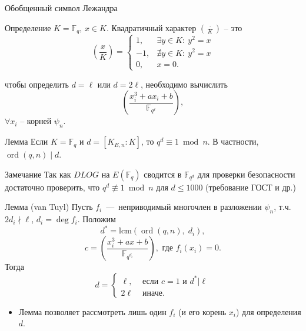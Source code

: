\documentclass{beamer}
\begin{document}
\begin{frame}{Обобщенный символ Лежандра}
\begin{block}{Определение}
    $K = \mathbb{F}_q$, $x \in K$. Квадратичный характер $\left( \frac{ \cdot }{K} \right)$ -- это 
    $$
    \left( \frac{x}{K} \right ) =
    \begin{cases}
        1,& \exists y \in K:\:{y^2} = x \\
        -1,& \nexists y \in K:\:{y^2} = x \\
        0, & x = 0.
    \end{cases}
    $$
\end{block}
\begin{center}
\structure{$\Downarrow$}
\end{center}
чтобы определить $d = \ell$ или $d = 2\ell$, необходимо вычислить 
\[
\left(  {\frac{x_i^3 + a{x_i} + b}{\mathbb{F}_{q^\ell}}} \right ),
\]
$\forall x_i$ -- корней $\psi_n$. 
\end{frame}

\begin{frame}
	\begin{block}{Лемма}
		Если $K = \mathbb{F}_q$ и $d = [K_{E,n} : K]$, то $q^d \equiv 1 \bmod{n}$. В частности, $\operatorname{ord}(q,n) \mid d$.
	\end{block}

\vspace*{1em}
\begin{block}{Замечание}
Так как $DLOG$ на $E(\mathbb{F}_q)$ сводится в $\mathbb{F}_{q^d}$ для проверки безопасности достаточно проверить, что $q^d \not\equiv 1 \bmod{n}$ для $d \leq 1000$ (требование ГОСТ и др.)
\end{block}
\end{frame}

\begin{frame}%
\begin{block}{Лемма (van Tuyl)}
    Пусть $f_i$~---~неприводимый многочлен в разложении ${\psi _n}$, т.ч. $2 d_i \nmid \ell$, $d_i = \deg f_i$. Положим
    \[
    {d^*} = \mathrm{lcm}( {\operatorname{ord} ( {q,n} ),\;{d_i}} ),
    \]
    \[
    c = \left(\frac{x_i^3 + a x + b}{\mathbb{F}_{q^{d_i}}} \right),{\text{ где }} f_i( x_i ) = 0.
    \]
    Тогда
    $$
    d = 
    \begin{cases}
        \ell, &\text{ если } c=1 \text{ и } d^*| \ell  \\
        2\ell & \text{ иначе. }
    \end{cases}
    $$
\end{block}
\begin{itemize}
    \item Лемма позволяет рассмотреть лишь один $f_i$ (и его корень $x_i$) для определения $d$. 
\end{itemize}
\end{frame}
\end{document}
